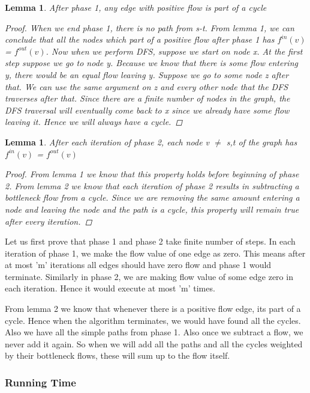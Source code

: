 \documentclass[12pt]{article}
\newtheorem{lemma}[theorem]{Lemma}
\begin{document}
\begin{lemma} After phase 1, any edge with positive flow is part of a cycle
\begin{proof}
When we end phase 1, there is no path from s-t. From lemma 1, we can conclude that all the nodes which part of a positive flow after phase 1 has $f^{in}(v)$ = $f^{out}(v)$. Now when we perform DFS, suppose we start on node x. At the first step suppose we go to node y. Because we know that there is some flow entering y, there would be an equal flow leaving y. Suppose we go to some node z after that. We can use the same argument on z and every other node that the DFS traverses after that. Since there are a finite number of nodes in the graph, the DFS traversal will eventually come back to x since we already have some flow leaving it. Hence we will always have a cycle.
\end{proof}
\end{lemma}
\begin{lemma} After each iteration of phase 2, each node v $\neq$ s,t of the graph has $f^{in}(v)$ = $f^{out}(v)$
\begin{proof}
From lemma 1 we know that this property holds before beginning of phase 2. From lemma 2 we know that each iteration of phase 2 results in subtracting a bottleneck flow from a cycle. Since we are removing the same amount entering a node and leaving the node and the path is a cycle, this property will remain true after every iteration.
\end{proof}
\end{lemma}

Let us first prove that phase 1 and phase 2 take finite number of steps. In each iteration of phase 1, we make the flow value of one edge as zero. This means after at most 'm' iterations all edges should have zero flow and phase 1 would terminate. Similarly in phase 2, we are making flow value of some edge zero in each iteration. Hence it would execute at most 'm' times.


From lemma 2 we know that whenever there is a positive flow edge, its part of a cycle. Hence when the algorithm terminates, we would have found all the cycles. Also we have all the simple paths from phase 1. Also once we subtract a flow, we never add it again. So when we will add all the paths and all the cycles weighted by their bottleneck flows, these will sum up to the flow itself.
\subsubsection{Running Time}
\end{document}
